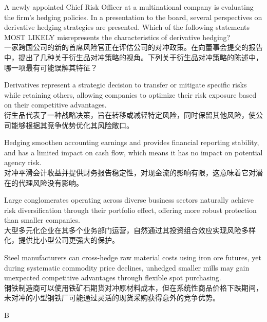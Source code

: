 \documentclass{article}
\newcounter{question} %
\begin{document}
\begin{question}
    A newly appointed Chief Risk Officer at a multinational company is evaluating the firm's hedging policies. In a presentation to the board, several perspectives on derivative hedging strategies are presented. Which of the following statements MOST LIKELY misrepresents the characteristics of derivative hedging?\\
    一家跨国公司的新的首席风险官正在评估公司的对冲政策。在向董事会提交的报告中，提出了几种关于衍生品对冲策略的视角。下列关于衍生品对冲策略的陈述中，哪一项最有可能误解其特征？
\end{question}

\begin{choices}
    \item Derivatives represent a strategic decision to transfer or mitigate specific risks while retaining others, allowing companies to optimize their risk exposure based on their competitive advantages. \\
    衍生品代表了一种战略决策，旨在转移或减轻特定风险，同时保留其他风险，使公司能够根据其竞争优势优化其风险敞口。
    
    \item Hedging smoothen accounting earnings and provides financial reporting stability, and has a limited impact on cash flow, which means it has no impact on potential agency risk. \\
    对冲平滑会计收益并提供财务报告稳定性，对现金流的影响有限，这意味着它对潜在的代理风险没有影响。
    
    \item Large conglomerates operating across diverse business sectors naturally achieve risk diversification through their portfolio effect, offering more robust protection than smaller companies. \\
    大型多元化企业在其多个业务部门运营，自然通过其投资组合效应实现风险多样化，提供比小型公司更强大的保护。

    \item Steel manufacturers can cross-hedge raw material costs using iron ore futures, yet during systematic commodity price declines, unhedged smaller mills may gain unexpected competitive advantages through flexible spot purchasing. \\
    钢铁制造商可以使用铁矿石期货对冲原材料成本，但在系统性商品价格下跌期间，未对冲的小型钢铁厂可能通过灵活的现货采购获得意外的竞争优势。
\end{choices}

\begin{correctanswer}
    B
\end{correctanswer}
\end{document}
